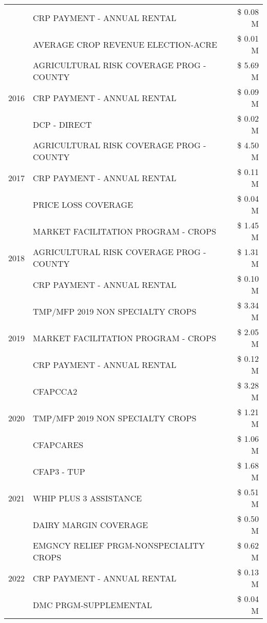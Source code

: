 \begin{tabular}{llr}
 & CRP PAYMENT - ANNUAL RENTAL & \$ 0.08 M \\
 & AVERAGE CROP REVENUE ELECTION-ACRE & \$ 0.01 M \\
\cline{1-3}
\multirow[t]{3}{*}{2016} & AGRICULTURAL RISK COVERAGE PROG - COUNTY & \$ 5.69 M \\
 & CRP PAYMENT - ANNUAL RENTAL & \$ 0.09 M \\
 & DCP - DIRECT & \$ 0.02 M \\
\cline{1-3}
\multirow[t]{3}{*}{2017} & AGRICULTURAL RISK COVERAGE PROG - COUNTY & \$ 4.50 M \\
 & CRP PAYMENT - ANNUAL RENTAL & \$ 0.11 M \\
 & PRICE LOSS COVERAGE & \$ 0.04 M \\
\cline{1-3}
\multirow[t]{3}{*}{2018} & MARKET FACILITATION PROGRAM - CROPS & \$ 1.45 M \\
 & AGRICULTURAL RISK COVERAGE PROG - COUNTY & \$ 1.31 M \\
 & CRP PAYMENT - ANNUAL RENTAL & \$ 0.10 M \\
\cline{1-3}
\multirow[t]{3}{*}{2019} & TMP/MFP 2019 NON SPECIALTY CROPS & \$ 3.34 M \\
 & MARKET FACILITATION PROGRAM - CROPS & \$ 2.05 M \\
 & CRP PAYMENT - ANNUAL RENTAL & \$ 0.12 M \\
\cline{1-3}
\multirow[t]{3}{*}{2020} & CFAPCCA2 & \$ 3.28 M \\
 & TMP/MFP 2019 NON SPECIALTY CROPS & \$ 1.21 M \\
 & CFAPCARES & \$ 1.06 M \\
\cline{1-3}
\multirow[t]{3}{*}{2021} & CFAP3 - TUP & \$ 1.68 M \\
 & WHIP PLUS 3 ASSISTANCE & \$ 0.51 M \\
 & DAIRY MARGIN COVERAGE & \$ 0.50 M \\
\cline{1-3}
\multirow[t]{3}{*}{2022} & EMGNCY RELIEF PRGM-NONSPECIALITY CROPS & \$ 0.62 M \\
 & CRP PAYMENT - ANNUAL RENTAL & \$ 0.13 M \\
 & DMC PRGM-SUPPLEMENTAL & \$ 0.04 M \\
\cline{1-3}
\bottomrule
\end{tabular}

